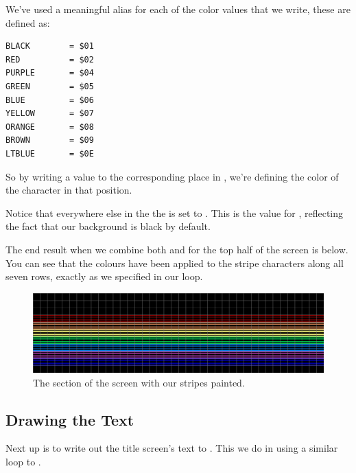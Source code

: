 We've used a meaningful alias for each of the color values that we write, these are defined as:

\begin{lstlisting}
BLACK        = $01
RED          = $02
PURPLE       = $04
GREEN        = $05
BLUE         = $06
YELLOW       = $07
ORANGE       = $08
BROWN        = $09
LTBLUE       = $0E
\end{lstlisting}

So by writing a value to the corresponding place in , we're defining the color of the character
in that position.

Notice that everywhere else in the the  is set to . This is the value for , reflecting the
fact that our background is black by default.



The end result when we combine both  and  for the top half of the screen is below. You can
see that the colours have been applied to the stripe characters along all seven rows, exactly as we specified in our 
 loop.

\begin{figure}[H]
    \begin{adjustbox}{width=13cm,center}
    \includegraphics[width=13cm]{titlescreen/titlescreen_colour_only_grid.png}%
    \end{adjustbox}
  \caption{The section of the screen with our stripes painted.}
\end{figure}

\subsection{Drawing the Text}

Next up is to write out the title screen's text to . This we do in 
using a similar loop to . 

